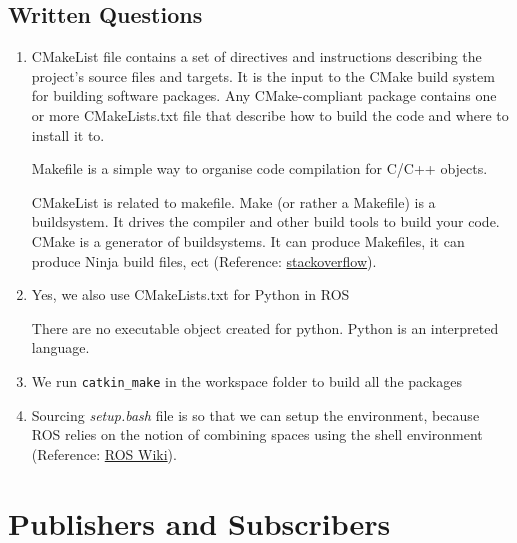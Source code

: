 \documentclass[letta4 paper]{article}
\numberwithin{equation}{section}
\newcommand{\0}{\mathbf{0}}
\begin{document}
	\subsection{Written Questions}
	\begin{enumerate}
		\item CMakeList file contains a set of directives and instructions describing the project's source files and targets. 
		It is the input to the CMake build system for building software packages. Any CMake-compliant package contains one or more CMakeLists.txt file that describe how to build the code and where to install it to.
		
		Makefile is a simple way to organise code compilation for C/C++ objects.
		
		CMakeList is related to makefile. Make (or rather a Makefile) is a buildsystem. 
		It drives the compiler and other build tools to build your code. CMake is a generator of buildsystems. It can produce Makefiles, it can produce Ninja build files, ect (Reference:
		\href{https://stackoverflow.com/questions/25789644/difference-between-using-makefile-and-cmake-to-compile-the-code}{stackoverflow}).
	 
		\item Yes, we also use CMakeLists.txt for Python in ROS

		There are no executable object created for python. Python is an interpreted language.
		\item We run \lstinline {catkin_make} in the workspace folder to build all the packages
		\item Sourcing \textit{setup.bash} file is so that we can setup the environment, because ROS relies on the notion of combining spaces using the shell environment 
		(Reference: \href{http://wiki.ros.org/ROS/Tutorials/InstallingandConfiguringROSEnvironment}{ROS Wiki}).
		
	\end{enumerate}{}

	\section{Publishers and Subscribers}
	
\end{document}
